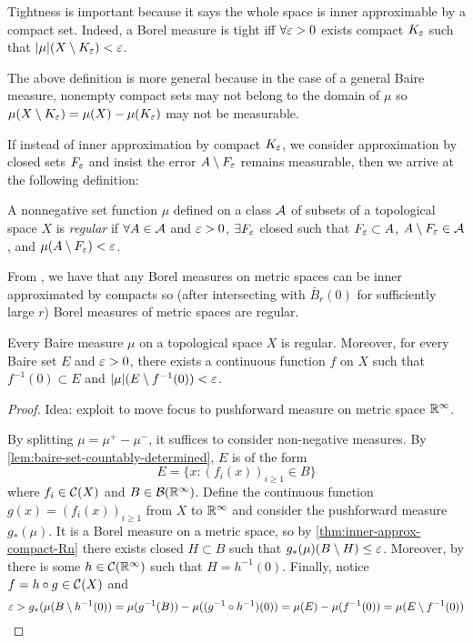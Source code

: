 Tightness is important because it says the whole space is inner approximable by
a compact set.  Indeed, a Borel measure is tight iff $\forall \varepsilon > 0$ exists
compact $K_\varepsilon$ such that $\lvert \mu \rvert(X \setminus K_\varepsilon) < \varepsilon$.

The above definition is more general because in the case of a general Baire
measure, nonempty compact sets may not belong to the domain of $\mu$ so $\mu(X
\setminus K_\varepsilon) = \mu(X) - \mu(K_\varepsilon)$ may not be measurable.

If instead of inner approximation by compact $K_\varepsilon$, we consider
approximation by closed sets $F_\varepsilon$ and insist the error
$A \setminus F_\varepsilon$ remains measurable,
then we arrive at the following definition:

\begin{definition}
  A nonnegative set function $\mu$
  defined on a class $\mathcal{A}$ of subsets of a topological space $X$
  is \emph{regular}
  if $\forall A \in \mathcal{A}$ and $\varepsilon > 0$, $\exists F_\varepsilon$
  closed such that $F_\varepsilon \subset A$, $A \setminus F_\varepsilon \in \mathcal{A}$,
  and $\mu(A \setminus F_\varepsilon) < \varepsilon$.
\end{definition}

From , we have that any Borel
measures on metric spaces can be inner approximated by compacts
so (after intersecting with $\bar{B}_r(0)$ for sufficiently large $r$)
Borel measures of metric spaces are regular.

\begin{corollary}
  \label{corr:baire-measure-regular}
  Every Baire measure $\mu$ on a topological space $X$ is regular.
  Moreover, for every Baire set $E$ and $\varepsilon > 0$,
  there exists a continuous function $f$ on $X$ such that
  $f^{-1}(0) \subset E$ and $\lvert \mu \rvert(E \setminus f^{-1}(0)) < \varepsilon$.
\end{corollary}

\begin{proof}
  Idea: exploit  to move focus
  to pushforward measure on metric space $\mathbb{R}^\infty$.

  By splitting $\mu = \mu^+ - \mu^-$, it suffices to consider non-negative
  measures.
  By \cref{lem:baire-set-countably-determined}, $E$ is of the form
  \[
    E = \{ x : (f_i(x))_{i \geq 1} \in B \}
  \]
  where $f_i \in \mathcal{C}(X)$ and $B \in \mathcal{B}(\mathbb{R}^\infty)$.
  Define the continuous function $g(x) = (f_i(x))_{i \geq 1}$
  from $X$ to $\mathbb{R}^\infty$ and consider the pushforward measure $g_\ast(\mu)$.
  It is a Borel measure on a metric space, so by
  \cref{thm:inner-approx-compact-Rn} there exists closed $H \subset B$ such
  that $g_\ast(\mu)(B \setminus H) \leq \varepsilon$.
  Moreover, by  there is some
  $h \in \mathcal{C}(\mathbb{R}^\infty)$ such that $H = h^{-1}(0)$.
  Finally, notice $f = h \circ g \in \mathcal{C}(X)$ and
  \[
    \varepsilon
    > g_\ast(\mu(B \setminus h^{-1}(0))
    = \mu(g^{-1}(B)) - \mu((g^{-1} \circ h^{-1})(0))
    = \mu(E) - \mu(f^{-1}(0))
    = \mu(E \setminus f^{-1}(0))
  \]
\end{proof}
